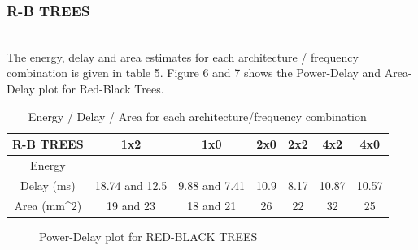 \documentclass[a4paper, twoside]{article}      %
\begin{document}
\subsubsection{R-B TREES}
\\
The energy, delay and area estimates for each architecture / frequency combination is given in table 5.
Figure 6 and 7 shows the Power-Delay and Area-Delay plot for Red-Black Trees.

\begin{table}[h!]
\caption{Energy / Delay / Area for each architecture/frequency combination}
\begin{center}
{\begin{tabular}{|c | c |  c |  c  | c  |  c |  c|}
\hline
R-B TREES &1x2 &1x0 &2x0 &2x2 &4x2 &4x0 \\ [1ex]
\hline
Energy &&&&&& \\ [1ex]
\hline
Delay (ms)& 18.74 and 12.5& 9.88 and 7.41& 10.9& 8.17& 10.87& 10.57\\[1ex] \hline
Area (mm^2)& 19 and 23& 18 and 21& 26& 22& 32& 25\\[1ex]
\hline

\end{tabular}}
\label{diffstruc}
\end{center}
\end{table}


\begin{figure}[h!]
{\centering {} \par}
\caption{Power-Delay plot for RED-BLACK TREES}
\end{figure}
\end{document}
